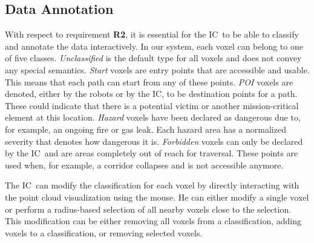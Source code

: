 \documentclass[conference,10pt,letter]{IEEEtran}
\def\IC{IC}
\begin{document}
\subsection{Data Annotation} \label{sec:overview:annotation}
With respect to requirement {\bfseries R2}, it is essential for the \IC\ to be able to classify and annotate the data interactively. In our system, each voxel can belong to one of five classes. \emph{Unclassified} is the default type for all voxels and does not convey any special semantics. \emph{Start} voxels are entry points that are accessible and usable. This means that each path can start from any of these points. \emph{POI} voxels are denoted, either by the robots or by the \IC, to be destination points for a path. These could indicate that there is a potential victim or another mission-critical element at this location. \emph{Hazard} voxels have been declared as dangerous due to, for example, an ongoing fire or gas leak. Each hazard area has a normalized severity that denotes how dangerous it is. \emph{Forbidden} voxels can only be declared by the \IC\ and are areas completely out of reach for traversal. These points are used when, for example, a corridor collapses and is not accessible anymore.

The \IC\ can modify the classification for each voxel by directly interacting with the point cloud visualization using the mouse. He can either modify a single voxel or perform a radius-based selection of all nearby voxels close to the selection. This modification can be either removing all voxels from a classification, adding voxels to a classification, or removing selected voxels.
\end{document}
